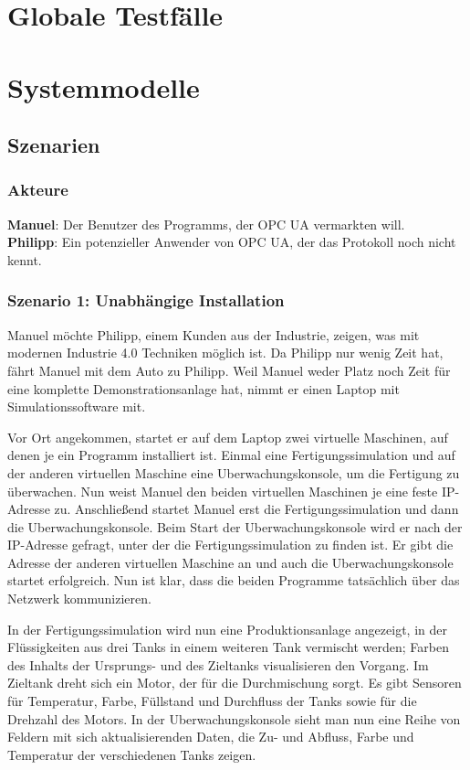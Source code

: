 \documentclass[parskip=full]{scrartcl}
\begin{document}
\pagebreak
\section{Globale Testfälle}
\Blindtext[1]

\pagebreak
\section{Systemmodelle}
\subsection{Szenarien}
\subsubsection*{Akteure}
\textbf{Manuel}: Der Benutzer des Programms, der \gls{OPC UA} vermarkten will.\\
\textbf{Philipp}: Ein potenzieller Anwender von OPC UA, der das Protokoll noch nicht kennt.

\subsubsection{Szenario 1: Unabhängige Installation}
Manuel möchte Philipp, einem Kunden aus der Industrie, zeigen, was mit modernen Industrie 4.0 Techniken möglich ist.
Da Philipp nur wenig Zeit hat, fährt Manuel mit dem Auto zu Philipp. Weil Manuel weder Platz 
noch Zeit für eine komplette Demonstrationsanlage hat, nimmt er einen Laptop mit Simulationssoftware mit.

Vor Ort angekommen, startet er auf dem Laptop zwei virtuelle Maschinen, auf denen je ein Programm installiert ist. 
Einmal eine \gls{Fertigungssimulation} und auf der anderen virtuellen Maschine eine \gls{Uberwachungskonsole}, um die Fertigung zu überwachen.
Nun weist Manuel den beiden virtuellen Maschinen je eine feste IP-Adresse zu.
Anschlie{\ss}end startet Manuel erst die \gls{Fertigungssimulation} und dann die \gls{Uberwachungskonsole}.
Beim Start der \gls{Uberwachungskonsole} wird er nach der IP-Adresse gefragt, unter der die \gls{Fertigungssimulation} zu finden ist. 
Er gibt die Adresse der anderen virtuellen Maschine an und auch die \gls{Uberwachungskonsole} startet erfolgreich. 
Nun ist klar, dass die beiden Programme tatsächlich über das Netzwerk kommunizieren.

In der \gls{Fertigungssimulation} wird nun eine \gls{Produktionsanlage} angezeigt, in der Flüssigkeiten aus drei Tanks
in einem weiteren Tank vermischt werden; Farben des Inhalts der Ursprungs- und des Zieltanks visualisieren den Vorgang. 
Im Zieltank dreht sich ein Motor, der für die Durchmischung sorgt.
Es gibt Sensoren für Temperatur, Farbe, Füllstand und Durchfluss der Tanks sowie für die Drehzahl des Motors.
In der \gls{Uberwachungskonsole} sieht man nun eine Reihe von Feldern mit sich aktualisierenden Daten,
die Zu- und Abfluss, Farbe und Temperatur der verschiedenen Tanks zeigen.
\end{document}
